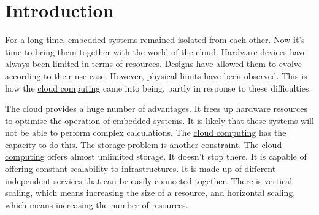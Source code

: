 %


\chapter{Introduction}
\label{chap:introduction}

For a long time, embedded systems remained isolated from each other. Now it's time to bring them together with the world of the \gls{cloud}. Hardware devices have always been limited in terms of resources. Designs have allowed them to evolve according to their use case. However, physical limits have been observed. This is how the \hyperref[subsec:cloudcomputing]{cloud computing} came into being, partly in response to these difficulties.

The \gls{cloud} provides a huge number of advantages. It frees up hardware resources to optimise the operation of embedded systems. It is likely that these systems will not be able to perform complex calculations. The \hyperref[subsec:cloudcomputing]{cloud computing} has the capacity to do this. The storage problem is another constraint. The \hyperref[subsec:cloudcomputing]{cloud computing} offers almost unlimited storage. It doesn't stop there. It is capable of offering constant scalability to infrastructures. It is made up of different independent services that can be easily connected together. There is vertical scaling, which means increasing the size of a resource, and horizontal scaling, which means increasing the number of resources.

